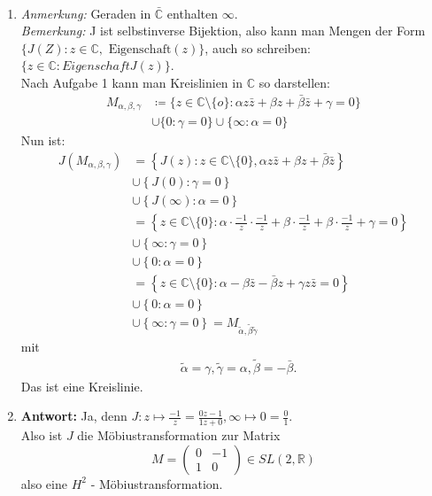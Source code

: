  \begin{solution}
  \
  \begin{enumerate}[label=(\alph*)] 
    \item \emph{Anmerkung:} Geraden in \( \bar{\mathbb{C}} \) enthalten \( \infty \). \\
  \emph{Bemerkung:} J ist selbstinverse Bijektion, also kann man Mengen der Form \( \{ J(Z): z \in \mathbb{C}, \text{ Eigenschaft} (z) \} \), auch so schreiben: \\
  \( \{ z \in \mathbb{C} : Eigenschaft J(z) \} \). \\
  Nach Aufgabe 1 kann man Kreislinien in \( \mathbb{C} \) so darstellen: \\
  \begin{align*}
    M_{\alpha, \beta, \gamma} &\coloneqq \{ z \in \mathbb{C} \setminus \{ o \} : \alpha z \bar{z} + \beta z + \bar{\beta} \bar{z} + \gamma = 0 \} \\
    &\cup \{ 0 : \gamma = 0 \} \cup \{ \infty : \alpha = 0 \}
  \end{align*}
  Nun ist:
  \begin{align*}
    J(M_{\alpha, \beta, \gamma}) &= \left \{ J(z): z \in \mathbb{C} \setminus \{ 0 \}, \alpha z \bar{z} + \beta z + \bar{\beta} \bar{z} \right \} \\
    &\cup \left \{ J(0): \gamma = 0 \right \} \\
    &\cup \left \{ J(\infty): \alpha = 0 \right \} \\
    &= \left \{ z \in \mathbb{C} \setminus \{ 0 \} : \alpha \cdot \frac{-1}{z} \cdot \frac{-1}{z} + \beta \cdot \frac{-1}{z} + \beta \cdot \frac{-1}{z} + \gamma = 0 \right \} \\
    &\cup \left \{ \infty : \gamma = 0 \right \} \\
    &\cup \left \{ 0 : \alpha = 0 \right \} \\
    &= \left \{ z \in \mathbb{C} \setminus \{ 0 \} : \alpha - \beta \bar{z} - \bar{\beta}z + \gamma z \bar{z} = 0 \right \} \\
    &\cup \left \{ 0 : \alpha = 0 \right \} \\
    &\cup \left \{ \infty : \gamma = 0 \right \} = M_{\tilde{\alpha}, \tilde{\beta} \tilde{\gamma}}
  \end{align*}
  mit
  \begin{align*}
    &\tilde{\alpha} = \gamma, \tilde{\gamma} = \alpha, \tilde{\beta} = - \bar{\beta}.
  \end{align*}
  Das ist eine Kreislinie.
  \item \textbf{Antwort:} Ja, denn \( J: z \mapsto \frac{-1}{z} = \frac{0z - 1}{1z + 0}, \infty \mapsto 0 = \frac{0}{1} \).\\
  Also ist \( J \) die Möbiustransformation zur Matrix
  \begin{equation*}
    M = \begin{pmatrix}
      0 & -1 \\
      1 & 0 
    \end{pmatrix} \in SL(2,\mathbb{R})
  \end{equation*}
  also eine \( H^2 \) - Möbiustransformation.
   \end{enumerate} 
 \end{solution}

